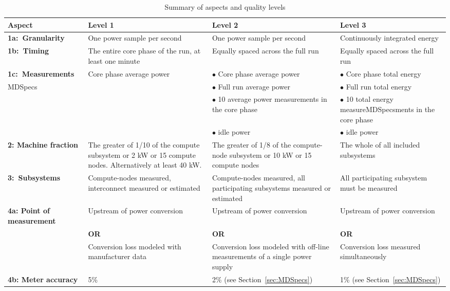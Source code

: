 \noindent
\begin{table}
\caption{Summary of aspects and quality levels}
\label{tab:levels}
\begin{tabular}{|p{3.0cm}|p{3.5cm}|p{3.5cm}|p{3.5cm}|} \hline
\textbf{Aspect}&\textbf{Level 1}&\textbf{Level 2}&\textbf{Level 3}\\ \hline

\textbf{1a:~Granularity} &
One power sample per second &
One power sample per second &
Continuously integrated energy\\
\hline


\textbf{1b:~Timing} &
The entire core phase of the run, at least one minute &
Equally spaced across the full run &
Equally spaced across the full run   \\
\hline

\textbf{1c:~Measurements} &
Core phase average power &
$\bullet$ Core phase average power & 
$\bullet$ Core phase total energy \\MDSpecs

 & &
$\bullet$ Full run average power &
$\bullet$ Full run total energy \\

 & &
$\bullet$ 10 average power measurements in the core phase &
$\bullet$ 10 total energy measureMDSpecsments in the core phase \\

 & &
$\bullet$ idle power &
$\bullet$ idle power \\
\hline

\textbf{2: Machine \newline fraction}  &
The greater of 1/10 of the compute subsystem or 2 kW or 15 compute nodes. Alternatively at least 40 kW. &
The greater of 1/8 of the compute-node subsystem or 10 kW or 15 compute nodes &
The whole of all included subsystems \\
\hline

\textbf{3:~Subsystems} &
Compute-nodes measured, interconnect measured or estimated &
Compute-nodes measured, all participating subsystems measured or estimated &
All participating subsystem must be measured \\
\hline

\textbf{4a: Point of measurement} &
Upstream of power conversion &
Upstream of power conversion &
Upstream of power conversion\\

 &
\centering \textbf{OR} &
\centering \textbf{OR} &
\centering \textbf{OR} \tabularnewline

 &
Conversion loss modeled with manufacturer data &
Conversion loss modeled with off-line measurements of a single power supply &
Conversion loss measured simultaneously \\
\hline
\textbf{4b: Meter accuracy} &
5\% &
2\% (see Section~\ref{sec:MDSpecs})&
1\% (see Section~\ref{sec:MDSpecs})\\
\hline
\end{tabular}
\end{table}

